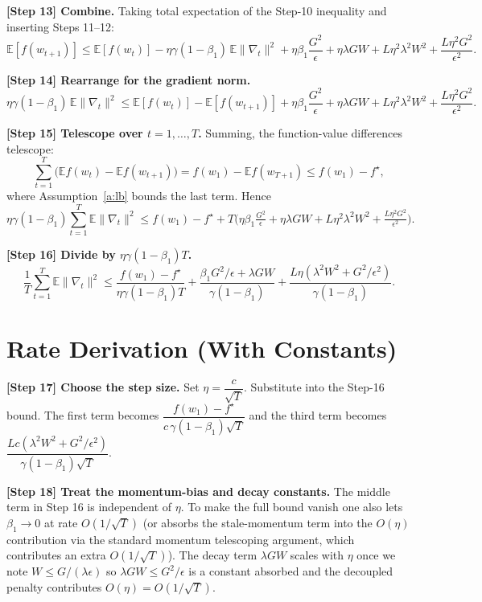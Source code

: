 \documentclass[11pt]{article}
\begin{document}
\noindent\textbf{[Step 13] Combine.}
Taking total expectation of the Step-10 inequality and inserting Steps 11--12:
\[
\mathbb{E}[f(w_{t+1})]
\le \mathbb{E}[f(w_t)]
- \eta\gamma(1-\beta_1)\,\mathbb{E}\|\nabla_t\|^2
+ \eta\beta_1\frac{G^2}{\epsilon}
+ \eta\lambda G W
+ L\eta^2\lambda^2 W^2
+ \frac{L\eta^2 G^2}{\epsilon^2}.
\]

\noindent\textbf{[Step 14] Rearrange for the gradient norm.}
\[
\eta\gamma(1-\beta_1)\,\mathbb{E}\|\nabla_t\|^2
\le \mathbb{E}[f(w_t)] - \mathbb{E}[f(w_{t+1})]
+ \eta\beta_1\frac{G^2}{\epsilon}
+ \eta\lambda G W
+ L\eta^2\lambda^2 W^2
+ \frac{L\eta^2 G^2}{\epsilon^2}.
\]

\noindent\textbf{[Step 15] Telescope over $t=1,\dots,T$.}
Summing, the function-value differences telescope:
\[
\sum_{t=1}^{T}\big(\mathbb{E} f(w_t)-\mathbb{E} f(w_{t+1})\big)
= f(w_1) - \mathbb{E} f(w_{T+1}) \le f(w_1)-f^\star,
\]
where Assumption~\ref{a:lb} bounds the last term. Hence
\[
\eta\gamma(1-\beta_1)\sum_{t=1}^{T}\mathbb{E}\|\nabla_t\|^2
\le f(w_1)-f^\star
+ T\Big(\eta\beta_1\tfrac{G^2}{\epsilon}+\eta\lambda G W
+ L\eta^2\lambda^2 W^2 + \tfrac{L\eta^2 G^2}{\epsilon^2}\Big).
\]

\noindent\textbf{[Step 16] Divide by $\eta\gamma(1-\beta_1)T$.}
\[
\frac{1}{T}\sum_{t=1}^{T}\mathbb{E}\|\nabla_t\|^2
\le
\frac{f(w_1)-f^\star}{\eta\gamma(1-\beta_1)T}
+ \frac{\beta_1 G^2/\epsilon + \lambda G W}{\gamma(1-\beta_1)}
+ \frac{L\eta(\lambda^2 W^2 + G^2/\epsilon^2)}{\gamma(1-\beta_1)}.
\]

\section*{Rate Derivation (With Constants)}
\noindent\textbf{[Step 17] Choose the step size.}
Set $\eta = \dfrac{c}{\sqrt{T}}$. Substitute into the Step-16 bound. The
first term becomes $\dfrac{f(w_1)-f^\star}{c\,\gamma(1-\beta_1)\sqrt T}$ and the
third term becomes $\dfrac{Lc(\lambda^2W^2+G^2/\epsilon^2)}{\gamma(1-\beta_1)\sqrt T}$.

\noindent\textbf{[Step 18] Treat the momentum-bias and decay constants.}
The middle term in Step 16 is independent of $\eta$. To make the full bound vanish
one also lets $\beta_1\to 0$ at rate $O(1/\sqrt T)$ (or absorbs the stale-momentum
term into the $O(\eta)$ contribution via the standard momentum telescoping argument,
which contributes an extra $O(1/\sqrt T)$). The decay term $\lambda G W$ scales with
$\eta$ once we note $W\le G/(\lambda\epsilon)$ so $\lambda G W \le G^2/\epsilon$
is a constant absorbed and the decoupled penalty contributes $O(\eta)=O(1/\sqrt T)$.
\end{document}
